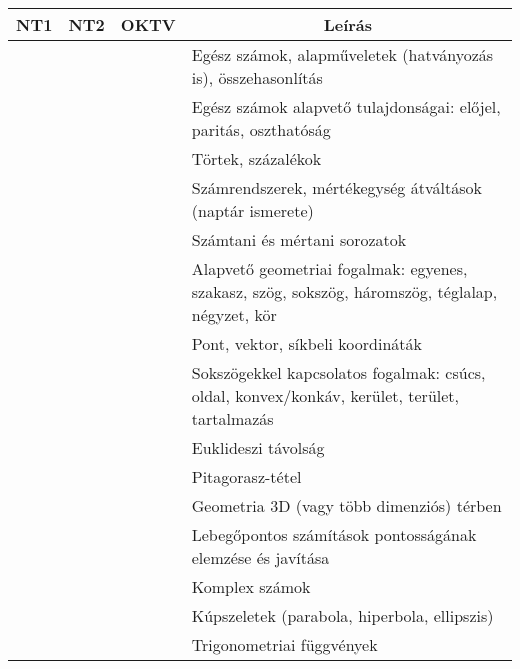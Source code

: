 \documentclass[a4paper,11pt,oneside]{article}
\newcommand{\cmark}{\ding{51}}%
\newcommand{\xmark}{\ding{55}}%
\newcommand{\cincl}{{\small\cmark}}
\newcommand{\cdefi}{{\small\cmark\faFileTextO}}
\newcommand{\ccode}{{\small\cmark\faFileText}}
\newcommand{\cemay}{{\small\xmark\faQuestionCircle}}
\newcommand{\cexcl}{{\small\xmark}}
\newcommand{\ctable}[1]{
    \begin{center}
        \begin{longtable}{ | C | C | C | m{8cm} | } %
        \hline
        \textbf{NT1} & \textbf{NT2} & \textbf{OKTV} & \multicolumn{1}{|c|}{\textbf{Leírás}} \\ \hline
        \endhead
        #1
        \end{longtable}
    \end{center}
}
\begin{document}
\ctable {
    \cincl & \cincl & \cincl & Egész számok, alapműveletek (hatványozás is), összehasonlítás
    \\ \hline %
    \cincl & \cincl & \cincl & Egész számok alapvető tulajdonságai: előjel, paritás, oszthatóság
    \\ \hline %
    \cincl & \cincl & \cincl & Törtek, százalékok
    \\ \hline %
    \cincl & \cincl & \cincl & Számrendszerek, mértékegység átváltások (naptár ismerete)
    \\ \hline %
    \cdefi & \cdefi & \cdefi & Számtani és mértani sorozatok 
    \\ \hline %
    \cincl & \cincl & \cincl & Alapvető geometriai fogalmak: egyenes, szakasz, szög, sokszög,
    háromszög, téglalap, négyzet, kör
    \\ \hline %
    \cexcl & \cemay & \cincl & Pont, vektor, síkbeli koordináták
    \\ \hline %
    \cexcl & \cemay & \cincl & Sokszögekkel kapcsolatos fogalmak: csúcs, oldal, konvex/konkáv, kerület, terület, tartalmazás
    \\ \hline %
    \cexcl & \cdefi & \cdefi & Euklideszi távolság 
    \\ \hline %
    \cexcl & \ccode & \ccode & Pitagorasz-tétel 
    \\ \hline %
    \cexcl & \cexcl & \cexcl & Geometria 3D (vagy több dimenziós) térben 
    \\ \hline %
    \cexcl & \cexcl & \cexcl & Lebegőpontos számítások pontosságának elemzése és javítása 
    \\ \hline %
    \cexcl & \cexcl & \cexcl & Komplex számok
    \\ \hline %
    \cexcl & \cexcl & \cexcl & Kúpszeletek (parabola, hiperbola, ellipszis) 
    \\ \hline %
    \cexcl & \cexcl & \cemay & Trigonometriai függvények 
    \\ \hline %
}
\end{document}
